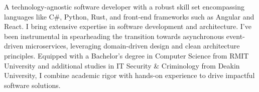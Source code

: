 %
%
%
\par{
A technology-agnostic software developer with a robust skill set encompassing languages like C\#, Python, Rust, and front-end frameworks such as Angular and React. I bring extensive expertise in software development and architecture. I've been instrumental in spearheading the transition towards asynchronous event-driven microservices, leveraging domain-driven design and clean architecture principles. Equipped with a Bachelor's degree in Computer Science from RMIT University and additional studies in IT Security \& Criminology from Deakin University, I combine academic rigor with hands-on experience to drive impactful software solutions.
}